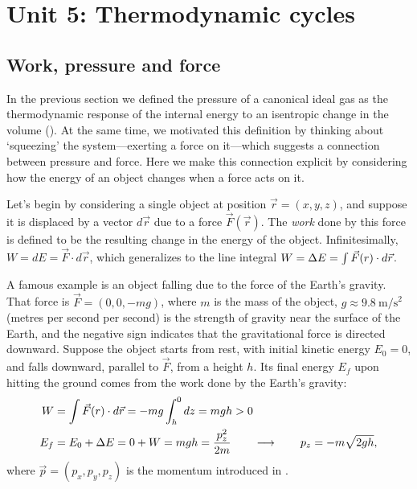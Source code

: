 \renewcommand{\thisunit}{MATH327 Unit 5}
\renewcommand{\moddate}{Last modified 23 Feb.~2022}
\setcounter{section}{5}
\setcounter{subsection}{0}
{}
\section*{Unit 5: Thermodynamic cycles}
\subsection{\label{sec:work}Work, pressure and force}
In the previous section we defined the pressure of a canonical ideal gas as the thermodynamic response of the internal energy to an isentropic change in the volume ().
At the same time, we motivated this definition by thinking about `squeezing' the system---exerting a force on it---which suggests a connection between pressure and force.
Here we make this connection explicit by considering how the energy of an object changes when a force acts on it.

Let's begin by considering a single object at position $\vec r = (x, y, z)$, and suppose it is displaced by a vector $d\vec r$ due to a force $\vec F(\vec r)$.
The \emph{work} done by this force is defined to be the resulting change in the energy of the object.
Infinitesimally, $W = dE = \vec F\cdot d\vec r$, which generalizes to the line integral $W = \Delta E = \int \vec F(r)\cdot d\vec r$.

A famous example is an object falling due to the force of the Earth's gravity.
That force is $\vec F = (0, 0, -mg)$, where $m$ is the mass of the object, $g \approx 9.8~\mathrm{m}/\mathrm{s}^2$ (metres per second per second) is the strength of gravity near the surface of the Earth, and the negative sign indicates that the gravitational force is directed downward.
Suppose the object starts from rest, with initial kinetic energy $E_0 = 0$, and falls downward, parallel to $\vec F$, from a height $h$.
Its final energy $E_f$ upon hitting the ground comes from the work done by the Earth's gravity:
\begin{align*}
  W & = \int \vec F(r)\cdot d\vec r = -mg \int_h^0 dz = mgh > 0 \\
  E_f & = E_0 + \Delta E = 0 + W = mgh = \frac{p_z^2}{2m} \qquad \longrightarrow \qquad p_z = -m\sqrt{2gh},
\end{align*}
where $\vec p = (p_x, p_y, p_z)$ is the momentum introduced in .

